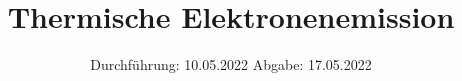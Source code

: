 

\subject{V504}
\title{Thermische Elektronenemission}
\date{%
  Durchführung: 10.05.2022
  \hspace{3em}
  Abgabe: 17.05.2022
}



\maketitle
\thispagestyle{empty}
\tableofcontents
\newpage






\printbibliography{}




